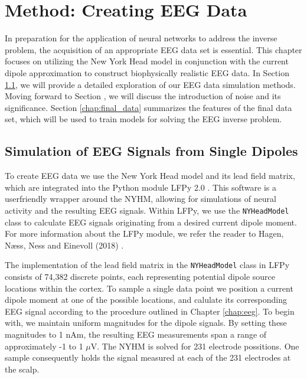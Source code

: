 \documentclass[a4paper, UKenglish, 11pt]{uiomaster}
\begin{document}
\chapter{Method: Creating EEG Data} \label{chap:eeg_data}
In preparation for the application of neural networks to address the inverse problem, the acquisition of an appropriate EEG data set is essential. This chapter focuses on utilizing the New York Head model in conjunction with the current dipole approximation to construct biophysically realistic EEG data.
In Section \ref{chap:simulation}, we will provide a detailed exploration of our EEG data simulation methods. Moving forward to Section \label{chap:noise}, we will discuss the introduction of noise and its significance. Section \ref{chap:final_data} summarizes the features of the final data set, which will be used to train models for solving the EEG inverse problem.


\section{Simulation of EEG Signals from Single Dipoles} \label{chap:simulation}
To create EEG data we use the New York Head model and its lead field matrix, which are integrated into the Python module LFPy 2.0 \cite{LFPy}. This software is a userfriendly wrapper around the NYHM, allowing for simulations of neural activity and the resulting EEG signals. Within LFPy, we use the \texttt{NYHeadModel} class to calculate EEG signals originating from a desired current dipole moment. For more information about the LFPy module, we refer the reader to Hagen, Næss, Ness and Einevoll (2018) \cite{LFPy}.

The implementation of the lead field matrix in the \texttt{NYHeadModel} class in LFPy consists of 74,382 discrete points, each representing potential dipole source locations within the cortex. To sample a single data point we position a current dipole moment at one of the possible locations, and calulate its corresponding EEG signal according to the procedure outlined in Chapter \ref{chap:eeg}. To begin with, we maintain uniform magnitudes for the dipole signals. By setting these magnitudes to 1 nAm, the resulting EEG measurements span a range of approximately -1 to 1 $\mu$V. The NYHM is solved for 231 electrode possitions. One sample consequently holds the signal measured at each of the 231 electrodes at the scalp.
\end{document}

